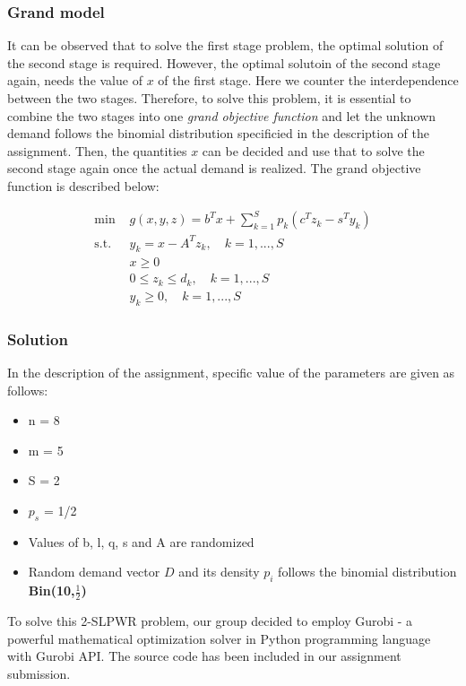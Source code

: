 		\subsubsection{Grand model}

		\qquad It can be observed that to solve the first stage problem, the optimal solution of the second stage is required. However, the optimal solutoin of the second stage again, needs the value of $x$ of the first stage. Here we counter the interdependence between the two stages. Therefore, to solve this problem, it is essential to combine the two stages into one \textit{grand objective function} and let the unknown demand follows the binomial distribution specificied in the description of the assignment. Then, the quantities $x$ can be decided and use that to solve the second stage again once the actual demand is realized. The grand objective function is described below:

		\begin{align*}
			\text{min } & g(x,y,z) = b^Tx + \sum_{k=1}^{S} p_k (c^T z_k - s^T y_k)\\
			\text{s.t. } & y_{k}=x- A^T z_k, \quad k=1,...,S \\
			& x \geq 0 \\
			& 0 \leq z_{k} \leq d_{k}, \quad k=1,...,S \\
			& y_k \geq 0, \quad k=1,...,S
		\end{align*}

		\subsubsection{Solution}

		\qquad In the description of the assignment, specific value of the parameters are given as follows:

		\begin{itemize}
			\item n = 8
			\item m = 5
			\item S = 2
			\item $p_s$ = 1/2
			\item Values of b, l, q, s and A are randomized 
			\item Random demand vector $D$ and its density $p_i$ follows the binomial distribution \textbf{Bin(10,$\frac{1}{2}$)}
		\end{itemize}

		\qquad To solve this 2-SLPWR problem, our group decided to employ Gurobi - a powerful mathematical optimization solver in Python programming language with Gurobi API. The source code has been included in our assignment submission. 


